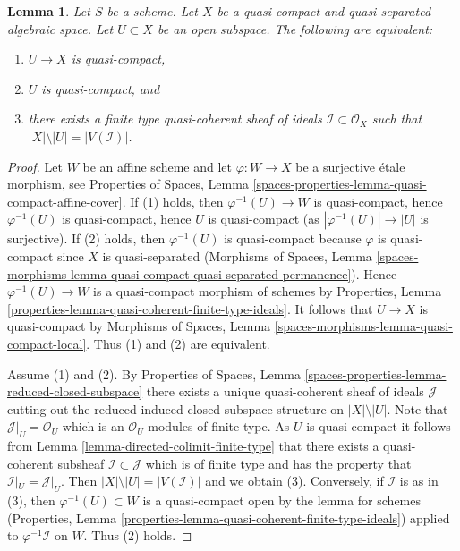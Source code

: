 \documentclass{stacks-project}
\theoremstyle{plain}
\newtheorem{lemma}[subsection]{Lemma}
\theoremstyle{definition}
\theoremstyle{remark}
\numberwithin{equation}{subsection}
\begin{document}
\begin{lemma}
\label{lemma-quasi-coherent-finite-type-ideals}
Let $S$ be a scheme.
Let $X$ be a quasi-compact and quasi-separated algebraic space.
Let $U \subset X$ be an open subspace. The following are equivalent:
\begin{enumerate}
\item $U \to X$ is quasi-compact,
\item $U$ is quasi-compact, and
\item there exists a finite type quasi-coherent sheaf of ideals
$\mathcal{I} \subset \mathcal{O}_X$ such that
$|X| \setminus |U| = |V(\mathcal{I})|$.
\end{enumerate}
\end{lemma}

\begin{proof}
Let $W$ be an affine scheme and let $\varphi : W \to X$ be a surjective
\'etale morphism, see Properties of Spaces, Lemma
\ref{spaces-properties-lemma-quasi-compact-affine-cover}.
If (1) holds, then $\varphi^{-1}(U) \to W$ is quasi-compact, hence
$\varphi^{-1}(U)$ is quasi-compact, hence $U$ is quasi-compact
(as $|\varphi^{-1}(U)| \to |U|$ is surjective). If (2) holds, then
$\varphi^{-1}(U)$ is quasi-compact because $\varphi$ is quasi-compact
since $X$ is quasi-separated (Morphisms of Spaces,
Lemma \ref{spaces-morphisms-lemma-quasi-compact-quasi-separated-permanence}).
Hence $\varphi^{-1}(U) \to W$ is a quasi-compact morphism of schemes by
Properties, Lemma \ref{properties-lemma-quasi-coherent-finite-type-ideals}.
It follows that $U \to X$ is quasi-compact by
Morphisms of Spaces, Lemma \ref{spaces-morphisms-lemma-quasi-compact-local}.
Thus (1) and (2) are equivalent.

\medskip\noindent
Assume (1) and (2). By
Properties of Spaces, Lemma
\ref{spaces-properties-lemma-reduced-closed-subspace} there exists
a unique quasi-coherent sheaf of ideals $\mathcal{J}$ cutting
out the reduced induced closed subspace structure on $|X| \setminus |U|$.
Note that $\mathcal{J}|_U = \mathcal{O}_U$ which is an
$\mathcal{O}_U$-modules of finite type.
As $U$ is quasi-compact it follows from
Lemma \ref{lemma-directed-colimit-finite-type}
that there exists a quasi-coherent subsheaf
$\mathcal{I} \subset \mathcal{J}$ which is of finite type
and has the property that $\mathcal{I}|_U = \mathcal{J}|_U$.
Then $|X| \setminus |U| = |V(\mathcal{I})|$ and we obtain (3). Conversely,
if $\mathcal{I}$ is as in (3), then $\varphi^{-1}(U) \subset W$
is a quasi-compact open by the lemma for schemes
(Properties, Lemma \ref{properties-lemma-quasi-coherent-finite-type-ideals})
applied to $\varphi^{-1}\mathcal{I}$ on $W$.
Thus (2) holds.
\end{proof}
\end{document}
